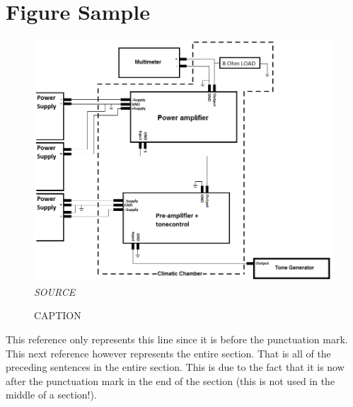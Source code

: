 \section{Figure Sample}

\begin{figure}[H]
	\caption{CAPTION}
	\label{LABEL}
	\centering
	\includegraphics[scale=.6]{figures/filename}
	\flushleft
	\textit{SOURCE}
\end{figure}


 

\vspace{.5cm}
\noindent
This reference only represents this line since it is before the punctuation mark\cite{YDing}. This next reference however represents the entire section. That is all of the preceding sentences in the entire section. This is due to the fact that it is now after the punctuation mark in the end of the section (this is not used in the middle of a section!).\cite{YDing}
\pagebreak